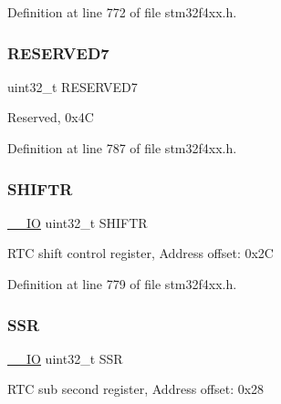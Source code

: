 Definition at line 772 of file stm32f4xx.\+h.

\mbox{\label{struct_r_t_c___type_def_a6be3d40baea405ecaf6b38462357dac0}} 
\subsubsection{\texorpdfstring{R\+E\+S\+E\+R\+V\+E\+D7}{RESERVED7}}
{\footnotesize\ttfamily uint32\+\_\+t R\+E\+S\+E\+R\+V\+E\+D7}

Reserved, 0x4C 

Definition at line 787 of file stm32f4xx.\+h.

\mbox{\label{struct_r_t_c___type_def_a2372c05a6c5508e0a9adada793f68b4f}} 
\subsubsection{\texorpdfstring{S\+H\+I\+F\+TR}{SHIFTR}}
{\footnotesize\ttfamily \hyperlink{group___c_m_s_i_s__core__definitions_gaec43007d9998a0a0e01faede4133d6be}{\+\_\+\+\_\+\+IO} uint32\+\_\+t S\+H\+I\+F\+TR}

R\+TC shift control register, Address offset\+: 0x2C 

Definition at line 779 of file stm32f4xx.\+h.

\mbox{\label{struct_r_t_c___type_def_a8a868e5e76b52ced04c536be3dee08ec}} 
\subsubsection{\texorpdfstring{S\+SR}{SSR}}
{\footnotesize\ttfamily \hyperlink{group___c_m_s_i_s__core__definitions_gaec43007d9998a0a0e01faede4133d6be}{\+\_\+\+\_\+\+IO} uint32\+\_\+t S\+SR}

R\+TC sub second register, Address offset\+: 0x28 

